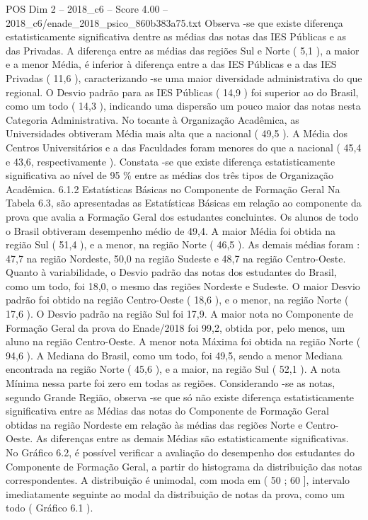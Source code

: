 \begin{textsample}{POS Dim 2 – 2018\_c6 – Score 4.00 – 2018\_c6/enade\_2018\_psico\_860b383a75.txt}
Observa -se que existe diferença estatisticamente significativa dentre as médias das notas das IES Públicas e as das Privadas.
A diferença entre as médias das regiões Sul e Norte ( 5,1 ), a maior e a menor Média, é inferior à diferença entre a das IES Públicas e a das IES Privadas ( 11,6 ), caracterizando -se uma maior diversidade administrativa do que regional.
O Desvio padrão para as IES Públicas ( 14,9 ) foi superior ao do Brasil, como um todo ( 14,3 ), indicando uma dispersão um pouco maior das notas nesta Categoria Administrativa.
No tocante à Organização Acadêmica, as Universidades obtiveram Média mais alta que a nacional ( 49,5 ).
A Média dos Centros Universitários e a das Faculdades foram menores do que a nacional ( 45,4 e 43,6, respectivamente ).
Constata -se que existe diferença estatisticamente significativa ao nível de 95 \% entre as médias dos três tipos de Organização Acadêmica. 6.1.2 Estatísticas Básicas no Componente de Formação Geral Na Tabela 6.3, são apresentadas as Estatísticas Básicas em relação ao componente da prova que avalia a Formação Geral dos estudantes concluintes.
Os alunos de todo o Brasil obtiveram desempenho médio de 49,4.
A maior Média foi obtida na região Sul ( 51,4 ), e a menor, na região Norte ( 46,5 ).
As demais médias foram : 47,7 na região Nordeste, 50,0 na região Sudeste e 48,7 na região Centro-Oeste.
Quanto à variabilidade, o Desvio padrão das notas dos estudantes do Brasil, como um todo, foi 18,0, o mesmo das regiões Nordeste e Sudeste.
O maior Desvio padrão foi obtido na região Centro-Oeste ( 18,6 ), e o menor, na região Norte ( 17,6 ).
O Desvio padrão na região Sul foi 17,9.
A maior nota no Componente de Formação Geral da prova do Enade/2018 foi 99,2, obtida por, pelo menos, um aluno na região Centro-Oeste.
A menor nota Máxima foi obtida na região Norte ( 94,6 ).
A Mediana do Brasil, como um todo, foi 49,5, sendo a menor Mediana encontrada na região Norte ( 45,6 ), e a maior, na região Sul ( 52,1 ).
A nota Mínima nessa parte foi zero em todas as regiões.
Considerando -se as notas, segundo Grande Região, observa -se que só não existe diferença estatisticamente significativa entre as Médias das notas do Componente de Formação Geral obtidas na região Nordeste em relação às médias das regiões Norte e Centro-Oeste.
As diferenças entre as demais Médias são estatisticamente significativas.
No Gráfico 6.2, é possível verificar a avaliação do desempenho dos estudantes do Componente de Formação Geral, a partir do histograma da distribuição das notas correspondentes.
A distribuição é unimodal, com moda em ( 50 ; 60 ], intervalo imediatamente seguinte ao modal da distribuição de notas da prova, como um todo ( Gráfico 6.1 ).

\end{textsample}
